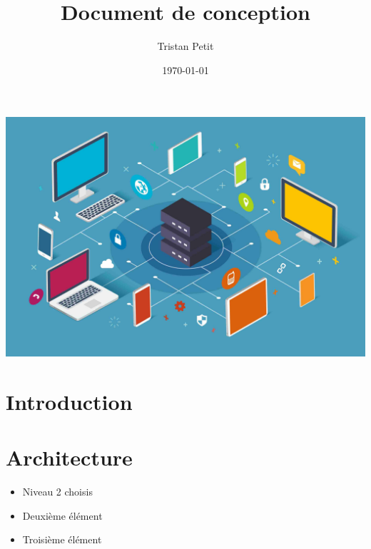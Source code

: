 \documentclass{article}
\begin{document}
\title{Document de conception}
\author{Tristan Petit}
\date{\today}
\maketitle
\begin{center}
    \vspace{1cm} %
    \includegraphics[width=1\textwidth]{images/Logo-project.jpeg} %
\end{center}

\maketitle


\newpage


\renewcommand{\contentsname}{Table des matières}

\tableofcontents

\newpage
{}

\section{Introduction}



\section{Architecture}

\begin{itemize}
    \item Niveau 2 choisis
    \item Deuxième élément
    \item Troisième élément
\end{itemize}
\end{document}
